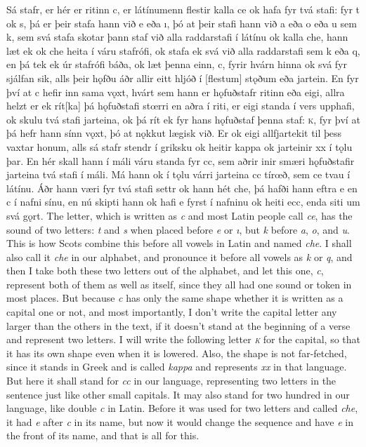 \begin{paracol}{2}
    Sá stafr, er hér er ritinn c, er látínumenn flestir kalla ce ok hafa fyr tvá stafi: fyr t ok s, þá er þeir stafa hann við e eða ı, þó at þeir stafi hann við a eða o eða u sem k, sem svá stafa skotar þann staf við alla raddarstafi í látínu ok kalla che, hann læt ek ok che heita í váru stafrófi, ok stafa ek svá við alla raddarstafi sem k eða q, en þá tek ek úr stafrófi báða, ok læt þenna einn, c, fyrir hvárn hinna ok svá fyr sjálfan sik, alls þeir hǫfðu áðr allir eitt hljóð í [flestum] stǫðum eða jartein. En fyr því at c hefir inn sama vǫxt, hvárt sem hann er hǫfuðstafr ritinn eða eigi, allra helzt er ek rít[ka] þá hǫfuðstafi stœrri en aðra í riti, er eigi standa í vers upphafi, ok skulu tvá stafi jarteina, ok þá rít ek fyr hans hǫfuðstaf þenna staf: \textsc{k}, fyr því at þá hefr hann sínn vǫxt, þó at nǫkkut lægisk við. Er ok eigi allfjartekit til þess vaxtar honum, alls sá stafr stendr í griksku ok heitir kappa ok jarteinir xx í tǫlu þar. En hér skall hann í máli váru standa fyr cc, sem aðrir inir smæri hǫfuðstafir jarteina tvá stafi í máli. Má hann ok í tǫlu várri jarteina cc tírœð, sem ce tvau í látínu. Áðr hann væri fyr tvá stafi settr ok hann hét che, þá hafði hann eftra e en c í nafni sínu, en nú skipti hann ok hafi e fyrst í nafninu ok heiti ecc, enda siti um svá gǫrt.
    \switchcolumn
    The letter, which is written as \textit{c} and most Latin people call \textit{ce}, has the sound of two letters: \textit{t} and \textit{s} when placed before \textit{e} or \textit{ı}, but \textit{k} before \textit{a}, \textit{o}, and \textit{u}. This is how Scots combine this before all vowels in Latin and named \textit{che}. I shall also call it \textit{che} in our alphabet, and pronounce it before all vowels as \textit{k} or \textit{q}, and then I take both these two letters out of the alphabet, and let this one, \textit{c}, represent both of them as well as itself, since they all had one sound or token in most places. But because \textit{c} has only the same shape whether it is written as a capital one or not, and most importantly, I don't write the capital letter any larger than the others in the text, if it doesn't stand at the beginning of a verse and represent two letters. I will write the following letter \textit{\textsc{k}} for the capital, so that it has its own shape even when it is lowered. Also, the shape is not far-fetched, since it stands in Greek and is called \textit{kappa} and represents \textit{xx} in that language. But here it shall stand for \textit{cc} in our language, representing two letters in the sentence just like other small capitals. It may also stand for two hundred in our language, like double \textit{c} in Latin. Before it was used for two letters and called \textit{che}, it had \textit{e} after \textit{c} in its name, but now it would change the sequence and have \textit{e} in the front of its name, and that is all for this.
\end{paracol}
